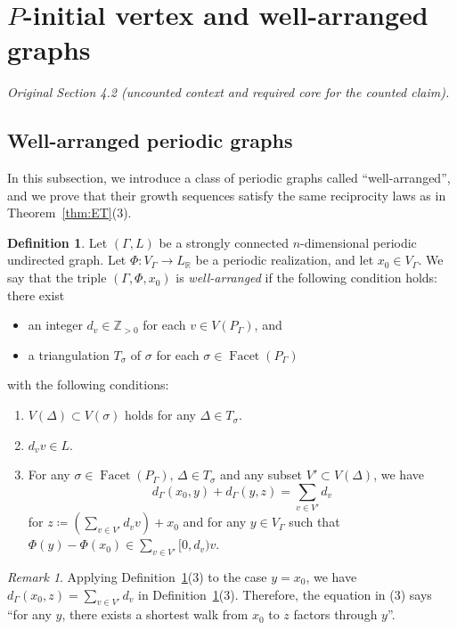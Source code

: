 \documentclass[10pt,a4paper]{amsart}
\providecommand{\texorpdfstring}[2]{#1}
\theoremstyle{plain}
\theoremstyle{definition}
\newtheorem{defi}[cdrthm]{Definition}
\theoremstyle{remark}
\newtheorem{rmk}[cdrthm]{Remark}
\begin{document}
\setcounter{section}{3}
\section{\texorpdfstring{$P$}{P}-initial vertex and well-arranged graphs}\label{section:PiniWA}

\noindent\textit{Original Section 4.2 (uncounted context and required core for the counted claim).}
\setcounter{subsection}{1}
\subsection{Well-arranged periodic graphs}\label{subsection:WA}
In this subsection, we introduce a class of periodic graphs called ``well-arranged'', 
and we prove that their growth sequences satisfy the same reciprocity laws as in Theorem~\ref{thm:ET}(3). 

\setcounter{cdrthm}{4}
\begin{defi}\label{defi:WA}
Let $(\Gamma , L)$ be a strongly connected $n$-dimensional periodic undirected graph. 
Let $\Phi : V_{\Gamma} \to L_{\mathbb{R}}$ be a periodic realization, 
and let $x_0 \in V_{\Gamma}$. We say that the triple $(\Gamma, \Phi, x_0)$ is \textit{well-arranged} if 
the following condition holds: 
there exist 
\begin{itemize}
\item 
an integer $d_v \in \mathbb{Z}_{>0}$ for each $v \in V(P_{\Gamma})$, and 
\item 
a triangulation $T_{\sigma}$ of $\sigma$ for each $\sigma \in \operatorname{Facet}(P_{\Gamma})$
\end{itemize}
with the following conditions: 
\begin{enumerate}
\item 
$V(\Delta) \subset V(\sigma)$ holds for any $\Delta \in T_\sigma$. 

\item 
$d_v v \in L$. 

\item
For any $\sigma \in \operatorname{Facet}(P_{\Gamma})$, $\Delta \in T_{\sigma}$ and any subset $V' \subset V(\Delta)$, we have  
\[
d_{\Gamma}(x_0, y) + d_{\Gamma}(y, z) = \sum _{v \in V'} d_v
\]
for $z \coloneqq  \left( \sum _{v \in V'} d_v v \right) + x_0$ and for any $y \in V_{\Gamma}$ 
such that $\Phi(y) - \Phi(x_0) \in \sum _{v \in V'} [0,d_v) v$. 
\end{enumerate}
\end{defi}

\begin{rmk}
Applying Definition~\ref{defi:WA}(3) to the case $y=x_0$, we have $d_{\Gamma}(x_0, z) = \sum _{v \in V'} d_v$ in Definition~\ref{defi:WA}(3). 
Therefore, the equation in (3) says 
``for any $y$, there exists a shortest walk from $x_0$ to $z$ factors through $y$''. 
\end{rmk}
\end{document}
